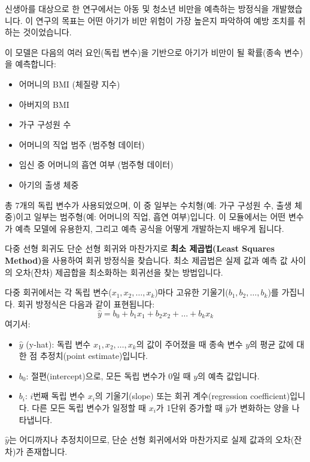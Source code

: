 \documentclass[11pt,a4paper]{book}
\theoremstyle{definition}
\begin{document}
\begin{examplebox}[title=\textbf{예시: 아동 비만 예측 모델}]
신생아를 대상으로 한 연구에서는 아동 및 청소년 비만을 예측하는 방정식을 개발했습니다. 이 연구의 목표는 어떤 아기가 비만 위험이 가장 높은지 파악하여 예방 조치를 취하는 것이었습니다.

이 모델은 다음의 여러 요인(독립 변수)을 기반으로 아기가 비만이 될 확률(종속 변수)을 예측합니다:
\begin{itemize}
    \item 어머니의 BMI (체질량 지수)
    \item 아버지의 BMI
    \item 가구 구성원 수
    \item 어머니의 직업 범주 (범주형 데이터)
    \item 임신 중 어머니의 흡연 여부 (범주형 데이터)
    \item 아기의 출생 체중
\end{itemize}
총 7개의 독립 변수가 사용되었으며, 이 중 일부는 수치형(예: 가구 구성원 수, 출생 체중)이고 일부는 범주형(예: 어머니의 직업, 흡연 여부)입니다. 이 모듈에서는 어떤 변수가 예측 모델에 유용한지, 그리고 예측 공식을 어떻게 개발하는지 배우게 됩니다.
\end{examplebox}

\begin{tcolorbox}[title={\textbf{최소 제곱 추정 (Least Square Estimation)}}]
다중 선형 회귀도 단순 선형 회귀와 마찬가지로 \textbf{최소 제곱법(Least Squares Method)}을 사용하여 회귀 방정식을 찾습니다. 최소 제곱법은 실제 값과 예측 값 사이의 오차(잔차) 제곱합을 최소화하는 회귀선을 찾는 방법입니다.

다중 회귀에서는 각 독립 변수($x_1, x_2, \dots, x_k$)마다 고유한 기울기($b_1, b_2, \dots, b_k$)를 가집니다. 회귀 방정식은 다음과 같이 표현됩니다:
\[ \hat{y} = b_0 + b_1x_1 + b_2x_2 + \dots + b_kx_k \]
여기서:
\begin{itemize}
    \item $\hat{y}$ (y-hat): 독립 변수 $x_1, x_2, \dots, x_k$의 값이 주어졌을 때 종속 변수 $y$의 평균 값에 대한 점 추정치(point estimate)입니다.
    \item $b_0$: 절편(intercept)으로, 모든 독립 변수가 0일 때 $y$의 예측 값입니다.
    \item $b_i$: $i$번째 독립 변수 $x_i$의 기울기(slope) 또는 회귀 계수(regression coefficient)입니다. 다른 모든 독립 변수가 일정할 때 $x_i$가 1단위 증가할 때 $\hat{y}$가 변화하는 양을 나타냅니다.
\end{itemize}
$\hat{y}$는 어디까지나 추정치이므로, 단순 선형 회귀에서와 마찬가지로 실제 값과의 오차(잔차)가 존재합니다.
\end{tcolorbox}
\end{document}
